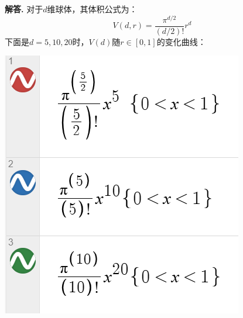 \documentclass[12pt, a4paper, oneside]{ctexart}
\newenvironment{solution}{\par\noindent\textbf{解答. }}{\par}
\begin{document}
\begin{solution}
    对于$d$维球体，其体积公式为：
    \[V(d, r) = \frac{\pi^{d/2}}{(d/2)!} r^d\]
    下面是$d=5,10,20$时，$V(d)$随$r\in[0,1]$的变化曲线：
   \begin{center}
    \begin{minipage}{0.48\textwidth}
        \centering
        \includegraphics[width=\linewidth]{image-1.png}
    \end{minipage}\hfill
    \begin{minipage}{0.48\textwidth}
        \centering

\end{minipage}
\end{center}
\end{solution}
\end{document}
